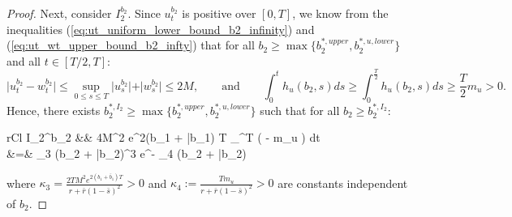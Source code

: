 \documentclass[11pt]{article}
\begin{document}
\begin{proof}
	Next, consider $I_2^{b_2}$. 
	Since $u_t^{b_2}$ is positive over $[0,T]$, we know from the inequalities (\ref{eq:ut_uniform_lower_bound_b2_infinity}) and (\ref{eq:ut_wt_upper_bound_b2_infty}) that for all $b_2 \geq \max\{ b_2^{*,upper}, b_2^{*,u,lower} \}$ and all $t \in [T/2,T]$:
	\begin{equation*}
		\vert u_t^{b_2} - w_t^{b_2} \vert \leq \sup_{0 \leq s \leq T} \vert u_s^{b_2} \vert + \vert w_s^{b_2} \vert  \leq 2M,
		\qquad \text{and} \qquad
		\int_0^{t} h_u(b_2,s) ds \geq \int_0^{\frac{T}{2}} h_u(b_2,s) ds \geq \frac{T}{2} m_u >0.
	\end{equation*}
	Hence, there exists $b_2^{*,I_2} \geq \max \{ b_2^{*,upper}, b_2^{*,u,lower} \}$ such that for all $b_2 \geq b_2^{*,I_2}$:
	\begin{IEEEeqnarray}{rCl}
		I_2^{b_2} &\leq&   \cdot 4M^2 \cdot e^{2(b_1 + \bar{b}_1) T} \int_{}^{T} \exp\left( -  \cdot m_u  \right) dt \nonumber\\	
		&=& \kappa_3 (b_2 + \bar{b}_2)^3 e^{- \kappa_4 (b_2 + \bar{b}_2)} \leq \epsilon
	\label{eq:I2_b2_infty}
	\end{IEEEeqnarray}
	where $\kappa_3 = \frac{2 TM^2 e^{2(b_1 + \bar{b}_1) T} }{r + \bar{r}(1-\bar{s})^2} >0$ and $\kappa_4 :=  \frac{T  m_u}{r + \bar{r}(1-\bar{s})^2}>0$ are constants independent of $b_2$. 	
	

\end{proof}
\end{document}

